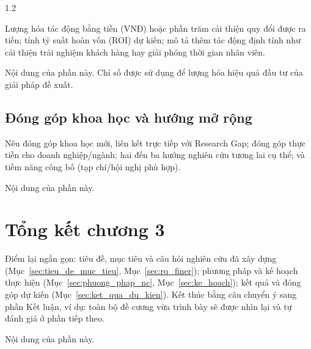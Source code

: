 \begin{spacing}{1.2}
\begin{huongdan}
Lượng hóa tác động bằng tiền (VNĐ) hoặc phần trăm cải thiện quy đổi được ra tiền; tính tỷ suất hoàn vốn (ROI) dự kiến; mô tả thêm tác động định tính như cải thiện trải nghiệm khách hàng hay giải phóng thời gian nhân viên.
\end{huongdan}

Nội dung của phần này. Chỉ số  được sử dụng để lượng hóa hiệu quả đầu tư của giải pháp đề xuất.

\subsection{Đóng góp khoa học và hướng mở rộng}
\label{subsec:dong_gop_mo_rong}

\begin{huongdan}
Nêu đóng góp khoa học mới, liên kết trực tiếp với Research Gap; đóng góp thực tiễn cho doanh nghiệp/ngành; hai đến ba hướng nghiên cứu tương lai cụ thể; và tiềm năng công bố (tạp chí/hội nghị phù hợp).
\end{huongdan}

Nội dung của phần này.

\section{Tổng kết chương 3}
\label{sec:tong_ket_c3}

\begin{huongdan}
Điểm lại ngắn gọn: tiêu đề, mục tiêu và câu hỏi nghiên cứu đã xây dựng (Mục~\ref{sec:tieu_de_muc_tieu}, Mục~\ref{sec:rq_finer}); phương pháp và kế hoạch thực hiện (Mục~\ref{sec:phuong_phap_nc}, Mục~\ref{sec:ke_hoach}); kết quả và đóng góp dự kiến (Mục~\ref{sec:ket_qua_du_kien}). Kết thúc bằng câu chuyển ý sang phần Kết luận, ví dụ: toàn bộ đề cương vừa trình bày sẽ được nhìn lại và tự đánh giá ở phần tiếp theo.
\end{huongdan}

Nội dung của phần này.

\end{spacing}
